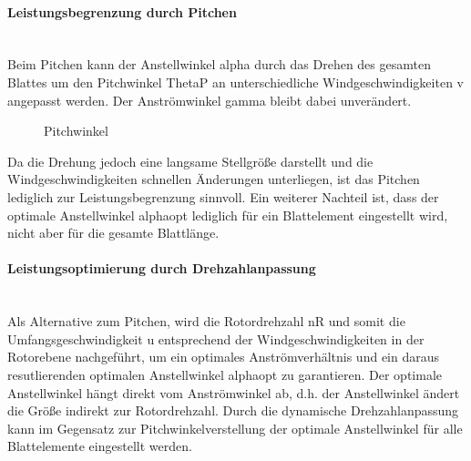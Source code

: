 \paragraph{Leistungsbegrenzung durch Pitchen}\mbox{}\smallskip\\
Beim Pitchen kann der Anstellwinkel \acs{alpha} durch das Drehen des gesamten Blattes um den Pitchwinkel \acs{ThetaP} an unterschiedliche Windgeschwindigkeiten \acs{v} angepasst werden. Der Anströmwinkel \acs{gamma} bleibt dabei unverändert.
\begin{figure}[H]
   \centering
   \caption[Pitchwinkel]{Pitchwinkel}
   \label{fig:Bild2.11}
\end{figure}

Da die Drehung jedoch eine langsame Stellgröße darstellt und die Windgeschwindigkeiten schnellen Änderungen unterliegen, ist das Pitchen lediglich zur Leistungsbegrenzung sinnvoll. Ein weiterer Nachteil ist, dass der optimale Anstellwinkel \acs{alphaopt} lediglich für ein Blattelement eingestellt wird, nicht aber für die gesamte Blattlänge.

\paragraph{Leistungsoptimierung durch Drehzahlanpassung}\mbox{}\smallskip\\
Als Alternative zum Pitchen, wird die Rotordrehzahl \acs{nR} und somit die Umfangsgeschwindigkeit \acs{u} entsprechend der Windgeschwindigkeiten in der Rotorebene nachgeführt, um ein optimales Anströmverhältnis und ein daraus resutlierenden optimalen Anstellwinkel \acs{alphaopt} zu garantieren. Der optimale Anstellwinkel hängt direkt vom Anströmwinkel ab, d.h. der Anstellwinkel ändert die Größe indirekt zur Rotordrehzahl. Durch die dynamische Drehzahlanpassung kann im Gegensatz zur Pitchwinkelverstellung der optimale Anstellwinkel für alle Blattelemente eingestellt werden.


